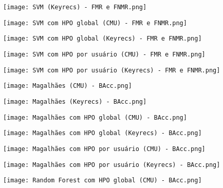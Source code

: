 \begin{figure}[H]
    \caption
    \label{}
    \centering
    \texttt{[image: SVM (Keyrecs) - FMR e FNMR.png]}
\end{figure}
\begin{figure}[H]
    \caption
    \label{}
    \centering
    \texttt{[image: SVM com HPO global (CMU) - FMR e FNMR.png]}
\end{figure}
\begin{figure}[H]
    \caption
    \label{}
    \centering
    \texttt{[image: SVM com HPO global (Keyrecs) - FMR e FNMR.png]}
\end{figure}
\begin{figure}[H]
    \caption
    \label{}
    \centering
    \texttt{[image: SVM com HPO por usuário (CMU) - FMR e FNMR.png]}
\end{figure}
\begin{figure}[H]
    \caption
    \label{}
    \centering
    \texttt{[image: SVM com HPO por usuário (Keyrecs) - FMR e FNMR.png]}
\end{figure}
\begin{figure}[H]
    \caption
    \label{}
    \centering
    \texttt{[image: Magalhães (CMU) - BAcc.png]}
\end{figure}
\begin{figure}[H]
    \caption
    \label{}
    \centering
    \texttt{[image: Magalhães (Keyrecs) - BAcc.png]}
\end{figure}
\begin{figure}[H]
    \caption
    \label{}
    \centering
    \texttt{[image: Magalhães com HPO global (CMU) - BAcc.png]}
\end{figure}
\begin{figure}[H]
    \caption
    \label{}
    \centering
    \texttt{[image: Magalhães com HPO global (Keyrecs) - BAcc.png]}
\end{figure}
\begin{figure}[H]
    \caption
    \label{}
    \centering
    \texttt{[image: Magalhães com HPO por usuário (CMU) - BAcc.png]}
\end{figure}
\begin{figure}[H]
    \caption
    \label{}
    \centering
    \texttt{[image: Magalhães com HPO por usuário (Keyrecs) - BAcc.png]}
\end{figure}
\begin{figure}[H]
    \caption
    \label{}
    \centering
    \texttt{[image: Random Forest com HPO global (CMU) - BAcc.png]}
\end{figure}
